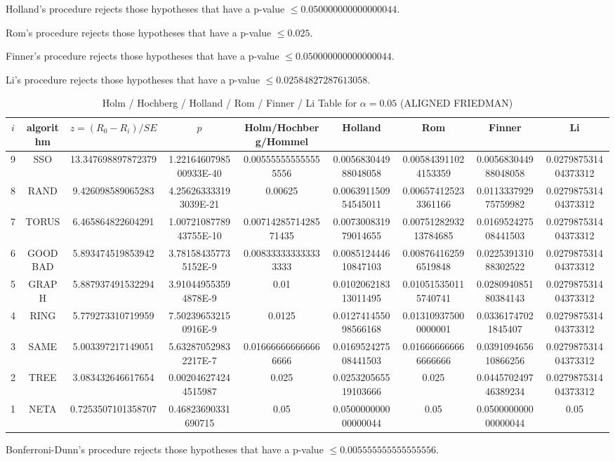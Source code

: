 \documentclass[a4paper,10pt]{article}
\begin{document}
\begin{landscape}
Holland's procedure rejects those hypotheses that have a p-value $\le0.050000000000000044$.


Rom's procedure rejects those hypotheses that have a p-value $\le0.025$.


Finner's procedure rejects those hypotheses that have a p-value $\le0.050000000000000044$.


Li's procedure rejects those hypotheses that have a p-value $\le0.02584827287613058$.



\newpage

\begin{table}[!htp]
\centering\scriptsize
\caption{Holm / Hochberg / Holland / Rom / Finner / Li Table for $\alpha=0.05$ (ALIGNED FRIEDMAN)}
\begin{tabular}{ccccccccc}
$i$&algorithm&$z=(R_0 - R_i)/SE$&$p$&Holm/Hochberg/Hommel&Holland&Rom&Finner&Li\\
\hline
9& SSO&13.347698897872379&1.2216460798500933E-40&0.005555555555555556&0.005683044988048058&0.005843911024153359&0.005683044988048058&0.027987531404373312\\
8& RAND&9.426098589065283&4.256263333193039E-21&0.00625&0.006391150954545011&0.006574125233361166&0.011333792975759982&0.027987531404373312\\
7& TORUS&6.465864822604291&1.0072108778943755E-10&0.0071428571428571435&0.007300831979014655&0.0075128293213784685&0.016952427508441503&0.027987531404373312\\
6& GOODBAD&5.893474519853942&3.781584357735152E-9&0.008333333333333333&0.008512444610847103&0.008764162596519848&0.022539131088302522&0.027987531404373312\\
5& GRAPH&5.887937491532294&3.910449553594878E-9&0.01&0.010206218313011495&0.010515350115740741&0.028094085180384143&0.027987531404373312\\
4& RING&5.779273310719959&7.502396532150916E-9&0.0125&0.012741455098566168&0.013109375000000001&0.03361747021845407&0.027987531404373312\\
3& SAME&5.003397217149051&5.632870529832217E-7&0.016666666666666666&0.016952427508441503&0.016666666666666666&0.039109465610866256&0.027987531404373312\\
2& TREE&3.083432646617654&0.002046274244515987&0.025&0.025320565519103666&0.025&0.044570249746389234&0.027987531404373312\\
1& NETA&0.7253507101358707&0.46823690331690715&0.05&0.050000000000000044&0.05&0.050000000000000044&0.05\\
\hline
\end{tabular}
\end{table}
Bonferroni-Dunn's procedure rejects those hypotheses that have a p-value $\le0.005555555555555556$.



\end{landscape}
\end{document}
